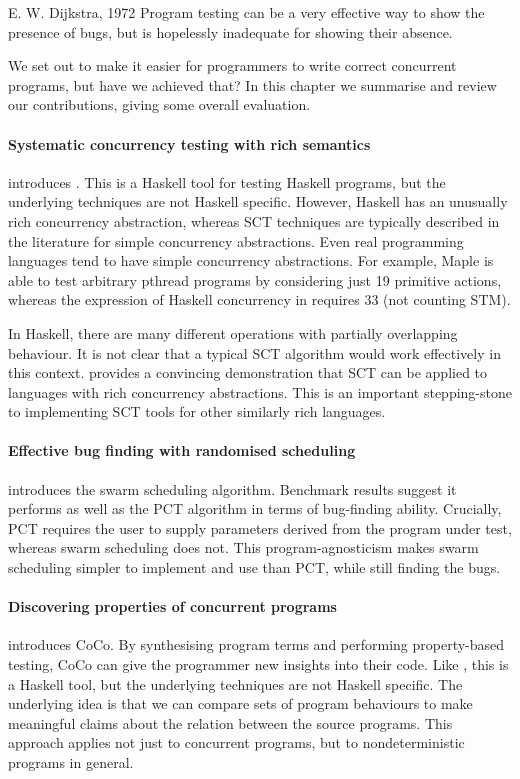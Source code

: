 \begin{bquote}{E. W. Dijkstra, 1972\nocite{ewd340}}
  Program testing can be a very effective way to show the presence of
  bugs, but is hopelessly inadequate for showing their absence.
\end{bquote}

\noindent
We set out to make it easier for programmers to write correct
concurrent programs, but have we achieved that?  In this chapter we
summarise and review our contributions, giving some overall
evaluation.

\paragraph{Systematic concurrency testing with rich semantics}
 introduces \dejafu{}.  This is a Haskell tool for
testing Haskell programs, but the underlying techniques are not
Haskell specific.  However, Haskell has an unusually rich concurrency
abstraction, whereas SCT techniques are typically described in the
literature for simple concurrency abstractions.  Even real programming
languages tend to have simple concurrency abstractions.  For example,
Maple\cite{yu2012} is able to test arbitrary pthread programs by
considering just 19 primitive actions, whereas the expression of
Haskell concurrency in \dejafu{} requires 33 (not counting STM).

In Haskell, there are many different operations with partially
overlapping behaviour.  It is not clear that a typical SCT algorithm
would work effectively in this context.  \dejafu{} provides a
convincing demonstration that SCT can be applied to languages with
rich concurrency abstractions.  This is an important stepping-stone to
implementing SCT tools for other similarly rich languages.

\paragraph{Effective bug finding with randomised scheduling}
 introduces the swarm scheduling algorithm.
Benchmark results suggest it performs as well as the PCT
algorithm\cite{burckhardt2010} in terms of bug-finding ability.
Crucially, PCT requires the user to supply parameters derived from the
program under test, whereas swarm scheduling does not.  This
program-agnosticism makes swarm scheduling simpler to implement and
use than PCT, while still finding the bugs.

\paragraph{Discovering properties of concurrent programs}
 introduces CoCo.  By synthesising program terms and
performing property-based testing, CoCo can give the programmer new
insights into their code.  Like \dejafu{}, this is a Haskell tool, but
the underlying techniques are not Haskell specific.  The underlying
idea is that we can compare sets of program behaviours to make
meaningful claims about the relation between the source programs.
This approach applies not just to concurrent programs, but to
nondeterministic programs in general.

